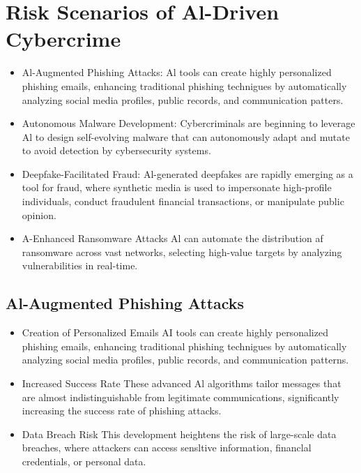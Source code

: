 \section{Risk Scenarios of Al-Driven Cybercrime}
\begin{itemize}
  \item  Al-Augmented Phishing Attacks: Al tools can create highly personalized
    phishing emails, enhancing traditional phishing technigues by automatically
    analyzing social media profiles, public records, and communication patters.
  \item  Autonomous Malware Development: Cybercriminals are beginning to
    leverage Al to design self-evolving malware that can autonomously adapt and
    mutate to avoid detection by cybersecurity systems.
  \item Deepfake-Facilitated Fraud: Al-generated deepfakes are rapidly emerging
    as a tool for fraud, where synthetic media is used to impersonate
    high-profile individuals, conduct fraudulent financial transactions, or
    manipulate public opinion.
  \item A-Enhanced Ransomware Attacks Al can automate the distribution af
    ransomware across vast networks, selecting high-value targets by analyzing
    vulnerabilities in real-time.
\end{itemize}

\subsection{Al-Augmented Phishing Attacks}
\begin{itemize}
  \item Creation of Personalized Emails AI tools can create highly personalized
    phishing emails, enhancing traditional phishing technigues by automatically
    analyzing social media profiles, public records, and communication
    patterns.
  \item Increased Success Rate These advanced Al algorithms tailor messages
    that are almost indistinguishable from legitimate communications,
    significantly increasing the success rate of phishing attacks.
  \item Data Breach Risk This development heightens the risk of large-scale
    data breaches, where attackers can access sensltive information, financlal
    credentials, or personal data.
\end{itemize}

